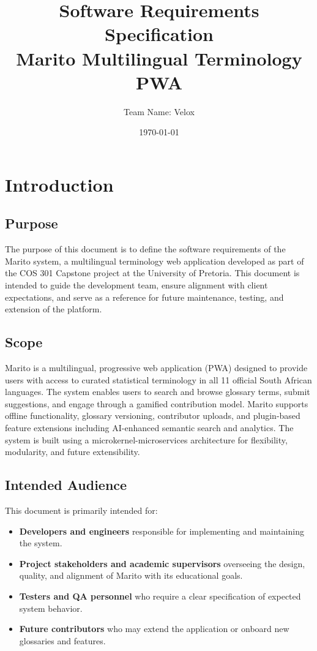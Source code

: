 \documentclass[12pt]{article}
\title{Software Requirements Specification\\\large\textbf{Marito Multilingual Terminology PWA}}
\author{Team Name: Velox}
\date{\today}
\begin{document}
\maketitle
\tableofcontents
\newpage

\section{Introduction}
\subsection{Purpose}
The purpose of this document is to define the software requirements of the Marito system, a multilingual terminology web application developed as part of the COS 301 Capstone project at the University of Pretoria. This document is intended to guide the development team, ensure alignment with client expectations, and serve as a reference for future maintenance, testing, and extension of the platform.

\subsection{Scope}
Marito is a multilingual, progressive web application (PWA) designed to provide users with access to curated statistical terminology in all 11 official South African languages. The system enables users to search and browse glossary terms, submit suggestions, and engage through a gamified contribution model. Marito supports offline functionality, glossary versioning, contributor uploads, and plugin-based feature extensions including AI-enhanced semantic search and analytics. The system is built using a microkernel-microservices architecture for flexibility, modularity, and future extensibility.

\subsection{Intended Audience}
This document is primarily intended for:
\begin{itemize}
    \item \textbf{Developers and engineers} responsible for implementing and maintaining the system.
    \item \textbf{Project stakeholders and academic supervisors} overseeing the design, quality, and alignment of Marito with its educational goals.
    \item \textbf{Testers and QA personnel} who require a clear specification of expected system behavior.
    \item \textbf{Future contributors} who may extend the application or onboard new glossaries and features.
\end{itemize}
\end{document}
